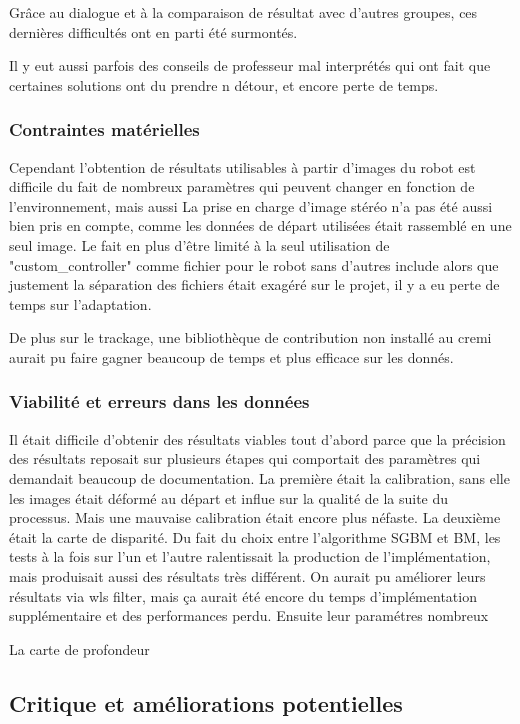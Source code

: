 \documentclass{article}
\begin{document}
Grâce au dialogue et à la comparaison de résultat avec d'autres groupes, ces dernières difficultés ont en parti été surmontés.

Il y eut aussi parfois des conseils de professeur mal interprétés qui ont fait que certaines solutions ont du prendre n détour, et encore perte de temps.

\subsubsection{Contraintes matérielles}

Cependant l'obtention de résultats utilisables à partir d'images du robot est difficile du fait de nombreux paramètres qui peuvent changer en fonction de l'environnement, mais aussi
La prise en charge d'image stéréo n'a pas été aussi bien pris en compte, comme les données de départ utilisées était rassemblé en une seul image. 
Le fait en plus d’être limité à la seul utilisation de "custom\_controller" comme fichier pour le robot sans d'autres include alors que justement la séparation des fichiers était exagéré sur le projet, il y a eu perte de temps sur l'adaptation.

De plus sur le trackage, une bibliothèque de contribution non installé au cremi aurait pu faire gagner beaucoup de temps et plus efficace sur les donnés.

\subsubsection{Viabilité et erreurs dans les données}

Il était difficile d'obtenir des résultats viables tout d'abord parce que la précision des résultats reposait sur plusieurs étapes qui comportait des paramètres qui demandait beaucoup de documentation.
La première était la calibration, sans elle les images était déformé au départ et influe sur la qualité de la suite du processus. Mais une mauvaise calibration était encore plus néfaste.
La deuxième était la carte de disparité. Du fait du choix entre l'algorithme SGBM et BM, les tests à la fois sur l'un et l'autre ralentissait la production de l'implémentation, mais produisait aussi des résultats très différent. On aurait pu améliorer leurs résultats via wls filter, mais ça aurait été encore du temps d'implémentation supplémentaire et des performances perdu.
Ensuite leur paramétres nombreux

La carte de profondeur

\subsection{Critique et améliorations potentielles}
\end{document}
